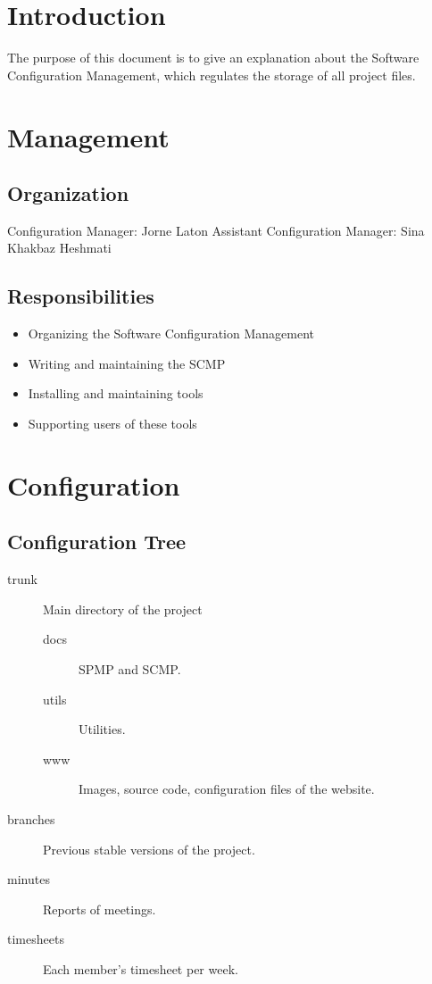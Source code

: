 \documentclass{article}
\begin{document}
\section{Introduction}
	The purpose of this document is to give an explanation about the Software Configuration Management, which regulates the storage of all project files.


\section{Management}
	\subsection{Organization}
		Configuration Manager: Jorne Laton\n
		Assistant Configuration Manager: Sina Khakbaz Heshmati
	\subsection{Responsibilities}
		\begin{itemize}
			\item Organizing the Software Configuration Management
			\item Writing and maintaining the SCMP
			\item Installing and maintaining tools
			\item Supporting users of these tools
		\end{itemize}


\section{Configuration}
	\subsection{Configuration Tree}
		\begin{description}
			\item[trunk]
				Main directory of the project
				\begin{description}
					\item[docs]
						SPMP and SCMP.
					\item[utils]
						Utilities.
					\item[www]
						Images, source code, configuration files of the website.
				\end{description}
			\item[branches]
				Previous stable versions of the project.
			\item[minutes]
				Reports of meetings.
			\item[timesheets]
				Each member's timesheet per week.
			\end{description}
\end{document}
